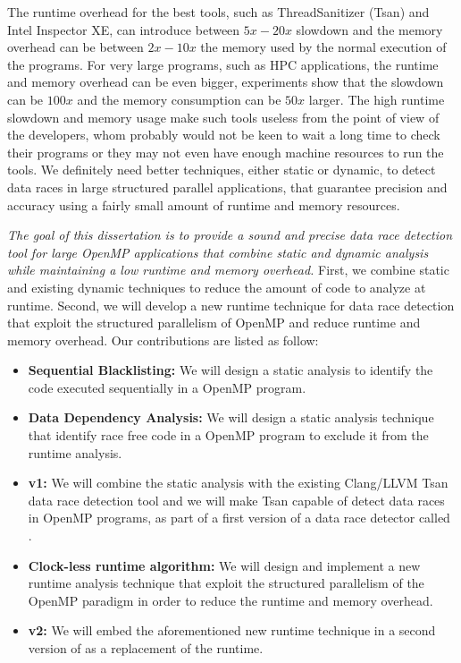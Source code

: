 The runtime overhead for the best tools, such as ThreadSanitizer (Tsan) and
Intel Inspector XE, can introduce between $5x-20x$ slowdown and the memory
overhead can be between $2x-10x$ the memory used by the normal execution of
the programs.
%
For very large programs, such as HPC applications, the runtime and memory
overhead can be even bigger, experiments show that the slowdown can be $100x$
and the memory consumption can be $50x$ larger.
%
The high runtime slowdown and memory usage make such tools useless from the
point of view of the developers, whom probably would not be keen to wait a
long time to check their programs or they may not even have enough machine
resources to run the tools.
%
We definitely need better techniques, either static or dynamic, to detect data
races in large structured parallel applications, that guarantee precision and
accuracy using a fairly small amount of runtime and memory resources.

\emph{The goal of this dissertation is to provide a sound and precise data
  race detection tool for large OpenMP applications that combine static and
  dynamic analysis while maintaining a low runtime and memory overhead.}
%
First, we combine static and existing dynamic techniques to reduce the amount
of code to analyze at runtime.
%
Second, we will develop a new runtime technique for data race detection that
exploit the structured parallelism of OpenMP and reduce runtime and memory
overhead.
%
Our contributions are listed as follow:

\begin{itemize}
\item \textbf{Sequential Blacklisting:} We will design a static analysis to
  identify the code executed sequentially in a OpenMP program.
\item \textbf{Data Dependency Analysis:} We will design a static analysis
  technique that identify race free code in a OpenMP program to exclude it
  from the runtime analysis.
\item \textbf{\archer v1:} We will combine the static analysis with the
  existing Clang/LLVM Tsan data race detection tool and we will make Tsan
  capable of detect data races in OpenMP programs, as part of a first version
  of a data race detector called \archer.
\item \textbf{Clock-less runtime algorithm:} We will design and implement a
  new runtime analysis technique that exploit the structured parallelism of
  the OpenMP paradigm in order to reduce the runtime and memory overhead.
\item \textbf{\archer v2:} We will embed the aforementioned new runtime
  technique in a second version of \archer as a replacement of the \tsan
  runtime.
\end{itemize}

